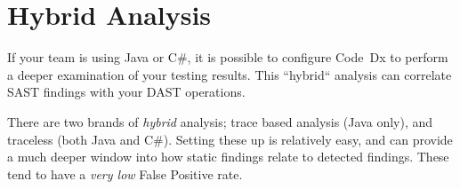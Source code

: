 \documentclass[11pt]{article}
\newcommand\codedx{{\color{blue}Code~Dx}\xspace}
\newcommand\java{Java\xspace}
\newcommand\csharp{C\#\xspace}
\begin{document}
\section{Hybrid Analysis}

If your team is using \java or \csharp, it is possible to configure \codedx to perform a deeper examination of
your testing results.  This ``hybrid`` analysis can correlate SAST findings with your DAST operations.

There are two brands of \emph{hybrid} analysis; trace based analysis (\java only), and traceless (both
\java and \csharp).  Setting these up is relatively easy, and can provide a much deeper window into how
static findings relate to detected findings.  These tend to have a \emph{very low} {\color{red} False Positive} rate.
\end{document}
